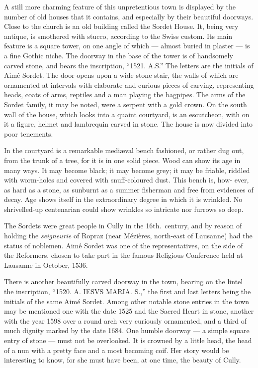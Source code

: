 \documentclass[11pt,a4paper,twocolumn]{article}
\begin{document}
A still more charming feature of this unpretentious town is displayed by the
number of old houses that it contains, and especially by their beautiful
doorways. Close to the church is an old building called the Sordet House. It,
being very antique, is smothered with stucco, according to the Swiss custom.
Its main feature is a square tower, on one angle of which --- almost buried
in plaster --- is a fine Gothic niche. The doorway in the base of the tower
is of handsomely carved stone, and bears the inscription, ``1521. A.S.'' The
letters are the initials of Aim\'{e} Sordet. The door opens upon a wide stone
stair, the walls of which are ornamented at intervals with elaborate and
curious pieces of carving, representing heads, coats of arms, reptiles and a
man playing the bagpipes. The arms of the Sordet family, it may be noted,
were a serpent with a gold crown. On the south wall of the house, which looks
into a quaint courtyard, is an escutcheon, with on it a figure, helmet and
lambrequin carved in stone. The house is now divided into poor tenements.

In the courtyard is a remarkable medi\ae val bench fashioned, or rather dug
out, from the trunk of a tree, for it is in one solid piece. Wood can show
its age in many ways. It may become black; it may become grey; it may be
friable, riddled with worm-holes and covered with snuff-coloured dust. This
bench is, how- ever, as hard as a stone, as sunburnt as a summer fisherman
and free from evidences of decay. Age shows itself in the extraordinary
degree in which it is wrinkled. No shrivelled-up centenarian could show
wrinkles so intricate nor furrows so deep.

The Sordets were great people in Cully in the 16th.\ century, and by reason
of holding the \emph{seigneurie} of Ropraz (near M\'{e}zi\`{e}res, north-east of
Lausanne) had the status of noblemen. Aim\'{e} Sordet was one of the
representatives, on the side of the Reformers, chosen to take part in the
famous Religious Conference held at Lausanne in October, 1536.

There is another beautifully carved doorway in the town, bearing on the
lintel the inscription, ``1520. A. IESVS MARIA. S.,'' the first and last
letters being the initials of the same Aim\'{e} Sordet. Among other notable stone
entries in the town may be mentioned one with the date 1525 and the Sacred
Heart in stone, another with the year 1598 over a round arch very curiously
ornamented, and a third of much dignity marked by the date 1684. One humble
doorway --- a simple square entry of stone --- must not be overlooked. It is
crowned by a little head, the head of a nun with a pretty face and a most
becoming coif. Her story would be interesting to know, for she must have
been, at one time, the beauty of Cully.
\end{document}
